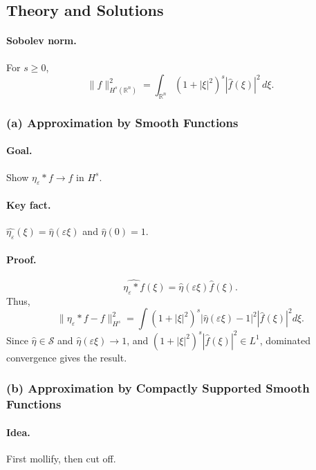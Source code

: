 \documentclass[12pt,a4paper]{article}
\theoremstyle{plain}
\theoremstyle{definition}
\theoremstyle{remark}
\theoremstyle{remark}
\begin{document}
\subsection*{Theory and Solutions}

\paragraph{Sobolev norm.}
For $s\ge 0$,
\[
\|f\|_{H^s(\mathbb{R}^n)}^2
= \int_{\mathbb{R}^n} (1+|\xi|^2)^s |\widehat{f}(\xi)|^2 \, d\xi.
\]

\subsubsection*{(a) \; Approximation by Smooth Functions}

\paragraph{\textbf{Goal.}}  
Show $\eta_\varepsilon * f \to f$ in $H^s$.

\paragraph{\textbf{Key fact.}}  
$\widehat{\eta_\varepsilon}(\xi)=\widehat{\eta}(\varepsilon\xi)$ and $\widehat{\eta}(0)=1$.

\paragraph{\textbf{Proof.}}
\[
\widehat{\eta_\varepsilon * f}(\xi)
= \widehat{\eta}(\varepsilon\xi)\widehat{f}(\xi).
\]
Thus,
\[
\|\eta_\varepsilon * f - f\|_{H^s}^2
= \int (1+|\xi|^2)^s 
|\widehat{\eta}(\varepsilon\xi)-1|^2 |\widehat{f}(\xi)|^2 d\xi.
\]
Since $\widehat{\eta}\in \mathscr{S}$ and $\widehat{\eta}(\varepsilon\xi)\to 1$, and  
$(1+|\xi|^2)^s|\widehat{f}(\xi)|^2\in L^1$, dominated convergence gives the result.

\subsubsection*{(b) \; Approximation by Compactly Supported Smooth Functions}

\paragraph{\textbf{Idea.}}
First mollify, then cut off.
\end{document}
